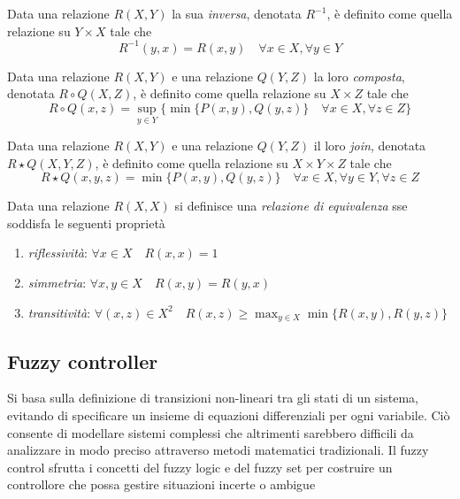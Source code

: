 \begin{definizione}
    Data una relazione $R(X,Y)$ la sua \textit{inversa}, denotata $R^{-1}$, è definito come quella relazione su $Y \times X$ tale che
    $$R^{-1} (y,x) = R(x,y) \quad \forall x \in X, \forall y \in Y$$
\end{definizione}

\begin{definizione}
    Data una relazione $R(X,Y)$ e una relazione $Q(Y,Z)$ la loro \textit{composta}, denotata $R \circ Q (X,Z)$, è definito come quella relazione su $X \times Z$ tale che
    $$R \circ Q (x,z) = \sup_{y \in Y} \{ \min \{ P(x,y),Q(y,z)\} \quad \forall x \in X, \forall z \in Z \} $$
\end{definizione}

\begin{definizione}
    Data una relazione $R(X,Y)$ e una relazione $Q(Y,Z)$ il loro \textit{join}, denotata $R \star Q (X,Y,Z)$, è definito come quella relazione su $X \times Y \times Z$ tale che
    $$R \star Q (x,y,z) = \min \{ P(x,y),Q(y,z)\} \quad \forall x \in X, \forall y \in Y, \forall z \in Z$$
\end{definizione}

\begin{definizione}
    Data una relazione $R(X,X)$ si definisce una \textit{relazione di equivalenza} sse soddisfa le seguenti proprietà
    \begin{enumerate}
        \item{\textit{riflessività}: $\forall x \in X \quad R(x,x) = 1$ }
        \item{\textit{simmetria}: $\forall x,y \in X \quad R(x,y) = R(y,x)$ }
        \item{\textit{transitività}: $\forall (x,z) \in X^2 \quad R(x,z) \geq \max_{y \in X} \min \{ R(x,y),R(y,z) \}$ }
    \end{enumerate}
\end{definizione}

\subsection{Fuzzy controller}
Si basa sulla definizione di transizioni non-lineari tra gli stati di un sistema, evitando di specificare un insieme di equazioni differenziali per ogni variabile. Ciò consente di modellare sistemi complessi che altrimenti sarebbero difficili da analizzare in modo preciso attraverso metodi matematici tradizionali. Il fuzzy control sfrutta i concetti del fuzzy logic e del fuzzy set per costruire un controllore che possa gestire situazioni incerte o ambigue

